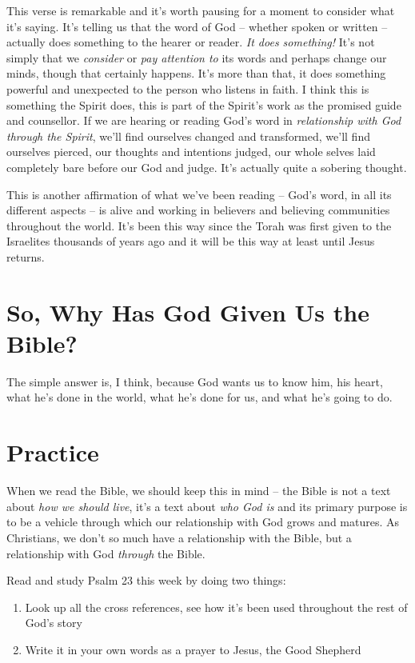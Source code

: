 This verse is remarkable and it's worth pausing for a moment to consider what
it's saying. It's telling us that the word of God -- whether spoken or written --
actually does something to the hearer or reader. \textit{It does something!}
It's not simply that we \textit{consider} or \textit{pay attention to} its words
and perhaps change our minds, though that certainly happens. It's more than
that, it does something powerful and unexpected to the person who listens in
faith. I think this is something the Spirit does, this is part of the Spirit's
work as the promised guide and counsellor. If we are hearing or reading God's
word in \textit{relationship with God through the Spirit}, we'll find ourselves
changed and transformed, we'll find ourselves pierced, our thoughts and
intentions judged, our whole selves laid completely bare before our God and
judge. It's actually quite a sobering thought.

This is another affirmation of what we've been reading -- God's word, in all its
different aspects -- is alive and working in believers and believing communities
throughout the world. It's been this way since the Torah was first given to the
Israelites thousands of years ago and it will be this way at least until Jesus
returns.

\section{So, Why Has God Given Us the Bible?}

The simple answer is, I think, because God wants us to know him, his heart, what
he's done in the world, what he's done for us, and what he's going to do.

\section{Practice}

When we read the Bible, we should keep this in mind – the Bible is not a text
about \textit{how we should live}, it's a text about \textit{who God is} and its
primary purpose is to be a vehicle through which our relationship with God grows
and matures. As Christians, we don't so much have a relationship with the Bible,
but a relationship with God \textit{through} the Bible.

Read and study Psalm 23 this week by doing two things:

\begin{enumerate}
    \item Look up all the cross references, see how it's been used throughout
        the rest of God's story
    \item Write it in your own words as a prayer to Jesus, the Good Shepherd
\end{enumerate}


